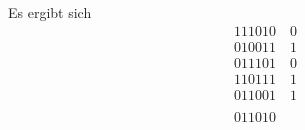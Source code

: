 \documentclass{../exercisesheet}
\begin{document}
\begin{exercise}{2.5}
	\begin{subexercise}
	Es ergibt sich
		\begin{equation*}
		\begin{split}
		&111010 \quad 0 \\
		&010011 \quad 1 \\
		&011101 \quad 0 \\
		&110111 \quad 1 \\
		&011001 \quad 1 \\
		& \\
		&011010
		\end{split}
		\end{equation*}
	\end{subexercise}

	\begin{subexercise}
	
	\end{subexercise}
\end{exercise}

\begin{exercise}{4}
	\begin{subexercise}
	
	\end{subexercise}
	
	\begin{subexercise}
	
	\end{subexercise}

	\begin{subexercise} 
		
	\end{subexercise}
\end{exercise}
\end{document}
